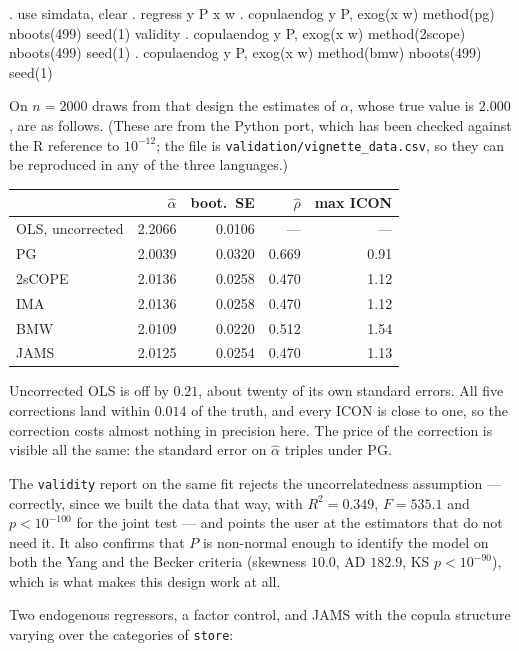\documentclass[11pt]{article}
\newcommand{\stcmd}[1]{\texttt{#1}}
\begin{document}
\begin{stata}
. use simdata, clear
. regress y P x w
. copulaendog y P, exog(x w) method(pg)     nboots(499) seed(1) validity
. copulaendog y P, exog(x w) method(2scope) nboots(499) seed(1)
. copulaendog y P, exog(x w) method(bmw)    nboots(499) seed(1)
\end{stata}

On $n = 2000$ draws from that design the estimates of $\alpha$, whose true
value is $2.000$, are as follows. (These are from the Python port, which has
been checked against the R reference to $10^{-12}$; the file is
\texttt{validation/vignette\_data.csv}, so they can be reproduced in any of the
three languages.)

\begin{center}
\small
\begin{tabular}{lrrrr}
\toprule
& $\hat\alpha$ & boot.\ SE & $\hat\rho$ & max ICON \\
\midrule
OLS, uncorrected & 2.2066 & 0.0106 & --- & --- \\
PG               & 2.0039 & 0.0320 & 0.669 & 0.91 \\
2sCOPE           & 2.0136 & 0.0258 & 0.470 & 1.12 \\
IMA              & 2.0136 & 0.0258 & 0.470 & 1.12 \\
BMW              & 2.0109 & 0.0220 & 0.512 & 1.54 \\
JAMS             & 2.0125 & 0.0254 & 0.470 & 1.13 \\
\bottomrule
\end{tabular}
\end{center}

Uncorrected OLS is off by $0.21$, about twenty of its own standard errors. All
five corrections land within $0.014$ of the truth, and every ICON is close to
one, so the correction costs almost nothing in precision here. The price of
the correction is visible all the same: the standard error on $\hat\alpha$
triples under PG.

The \stcmd{validity} report on the same fit rejects the uncorrelatedness
assumption --- correctly, since we built the data that way, with
$R^2 = 0.349$, $F = 535.1$ and $p < 10^{-100}$ for the joint test --- and
points the user at the estimators that do not need it. It also confirms that
$P$ is non-normal enough to identify the model on both the Yang and the Becker
criteria (skewness $10.0$, AD $182.9$, KS $p < 10^{-90}$), which is what makes
this design work at all.

Two endogenous regressors, a factor control, and JAMS with the copula
structure varying over the categories of \stcmd{store}:
\end{document}
